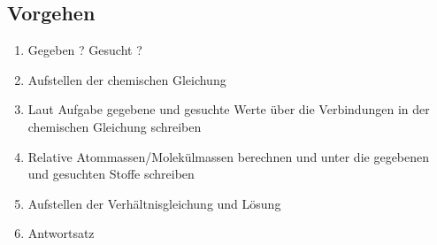 \subsection{Vorgehen}
\begin{enumerate}
\item Gegeben ? \quad Gesucht ?
\item Aufstellen der chemischen Gleichung
\item Laut Aufgabe gegebene und gesuchte Werte über die Verbindungen in der chemischen Gleichung schreiben
\item Relative Atommassen/Molekülmassen berechnen und unter die gegebenen und gesuchten Stoffe schreiben
\item Aufstellen der Verhältnisgleichung und Lösung
\item Antwortsatz
\end{enumerate}
